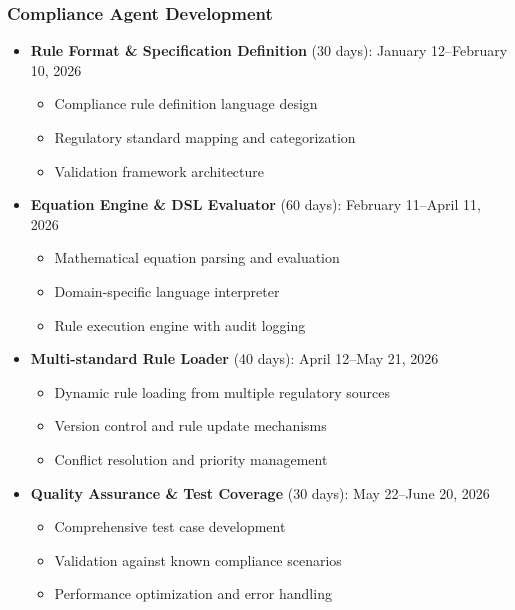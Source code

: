 \documentclass[12pt]{report}
\begin{document}
\subsubsection{Compliance Agent Development}
\begin{itemize}
  \item \textbf{Rule Format \& Specification Definition} (30 days): January 12--February 10, 2026
    \begin{itemize}
      \item Compliance rule definition language design
      \item Regulatory standard mapping and categorization
      \item Validation framework architecture
    \end{itemize}
  \item \textbf{Equation Engine \& DSL Evaluator} (60 days): February 11--April 11, 2026
    \begin{itemize}
      \item Mathematical equation parsing and evaluation
      \item Domain-specific language interpreter
      \item Rule execution engine with audit logging
    \end{itemize}
  \item \textbf{Multi-standard Rule Loader} (40 days): April 12--May 21, 2026
    \begin{itemize}
      \item Dynamic rule loading from multiple regulatory sources
      \item Version control and rule update mechanisms
      \item Conflict resolution and priority management
    \end{itemize}
  \item \textbf{Quality Assurance \& Test Coverage} (30 days): May 22--June 20, 2026
    \begin{itemize}
      \item Comprehensive test case development
      \item Validation against known compliance scenarios
      \item Performance optimization and error handling
    \end{itemize}
\end{itemize}
\end{document}
